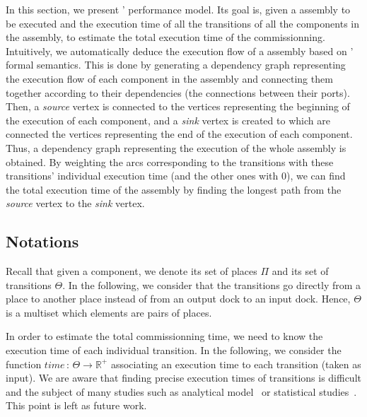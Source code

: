 In this section, we present \mad' performance model. Its goal is,
given a \mad assembly to be executed and the execution time of all the
transitions of all the components in the assembly, to estimate the total
execution time of the commissionning.
%
Intuitively, we automatically deduce the execution flow of a \mad
assembly based on \mad' formal semantics. This is done by generating a
dependency graph representing the execution flow of each \mad
component in the assembly and connecting them together according to their
dependencies (the connections between their ports). Then, a
\emph{source} vertex is connected to the vertices representing the beginning of
the execution of each component, and a \emph{sink} vertex is created to which
are connected the vertices representing the end of the execution of each
component.
%
Thus, a dependency graph representing the execution of the whole
assembly is obtained. By weighting the arcs corresponding to the transitions with
these transitions' individual execution time (and the other ones with 0),
we can find the total execution time of the assembly by finding the longest
path from the \emph{source} vertex to the \emph{sink} vertex.



\subsection{Notations}

Recall that given a component, we denote its set of places $\Pi$ and its
set of transitions $\Theta$. In the following, we consider that the
transitions go directly from a place to
another place instead of from an output dock to an input dock.
Hence, $\Theta$ is a multiset which elements are pairs of places.

In order to estimate the total commissionning time, we need to know
the execution time of each individual transition. In the following, we
consider the function $time\,:\,\Theta\rightarrow\mathbb{R}^{+}$
associating an execution time to each transition (taken as input). We
are aware that finding precise execution times of transitions is
difficult and the subject of many studies such as analytical
model~\cite{} or statistical studies~\cite{}. This point is left as
future work.

